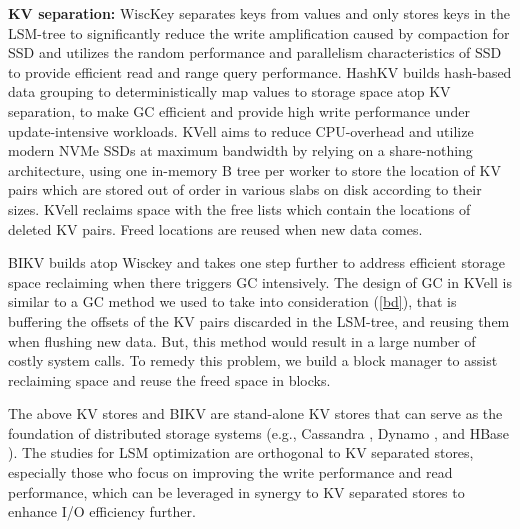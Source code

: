 \documentclass[sigconf]{acmart}
\begin{document}
\textbf{KV separation:} WiscKey \cite{Wisckey} separates keys from values and only stores keys in the LSM-tree to significantly reduce the write amplification caused by compaction for SSD and utilizes the random performance and parallelism characteristics of SSD to provide efficient read and range query performance. HashKV \cite{HashKV} builds hash-based data grouping to deterministically map values to storage space atop KV separation, to make GC efficient and provide high write performance under update-intensive workloads. KVell \cite{KVell} aims to reduce CPU-overhead and utilize modern NVMe SSDs at maximum bandwidth by relying on a share-nothing architecture, using one in-memory B tree per worker to store the location of KV pairs which are stored out of order in various slabs on disk according to their sizes. KVell reclaims space with the free lists which contain the locations of deleted KV pairs. Freed locations are reused when new data comes. 

BIKV builds atop Wisckey and takes one step further to address efficient storage space reclaiming when there triggers GC intensively. The design of GC in KVell is similar to a GC method we used to take into consideration (\ref{bd}), that is buffering the offsets of the KV pairs discarded in the LSM-tree, and reusing them when flushing new data. But, this method would result in a large number of costly system calls. To remedy this problem, we build a block manager to assist reclaiming space and reuse the freed space in blocks.

The above KV stores and BIKV are stand-alone KV stores that can serve as the foundation of distributed storage systems (e.g., Cassandra \cite{ Cassandra}, Dynamo \cite{ Dynamo}, and HBase \cite{HBase}). The studies for LSM optimization are orthogonal to KV separated stores, especially those who focus on improving the write performance and read performance, which can be leveraged in synergy to KV separated stores to enhance I/O efficiency further.
\end{document}
